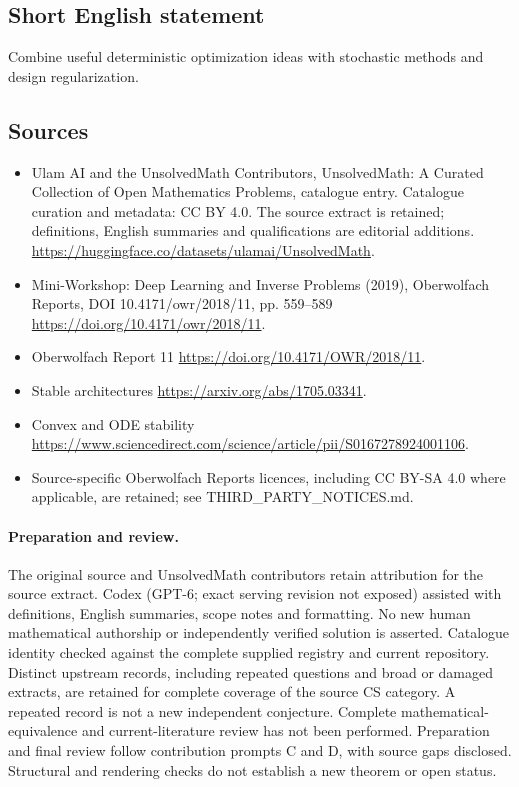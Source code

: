 \documentclass[11pt]{article}
\begin{document}
\subsection{Short English statement}
Combine useful deterministic optimization ideas with stochastic methods and design regularization.
\subsection{Sources}
\begin{itemize}
\item[\hypertarget{source:statement:1}{S1}] Ulam AI and the UnsolvedMath Contributors, UnsolvedMath: A Curated Collection of Open Mathematics Problems, catalogue entry. Catalogue curation and metadata: CC BY 4.0. The source extract is retained; definitions, English summaries and qualifications are editorial additions.
\url{https://huggingface.co/datasets/ulamai/UnsolvedMath}.
\item[\hypertarget{source:statement:2}{S2}] Mini-Workshop: Deep Learning and Inverse Problems (2019), Oberwolfach Reports, DOI 10.4171/owr/2018/11, pp. 559--589
\url{https://doi.org/10.4171/owr/2018/11}.
\item[\hypertarget{source:statement:3}{S3}] Oberwolfach Report 11
\url{https://doi.org/10.4171/OWR/2018/11}.
\item[\hypertarget{source:statement:4}{S4}] Stable architectures
\url{https://arxiv.org/abs/1705.03341}.
\item[\hypertarget{source:statement:5}{S5}] Convex and ODE stability
\url{https://www.sciencedirect.com/science/article/pii/S0167278924001106}.
\item Source-specific Oberwolfach Reports licences, including CC BY-SA 4.0 where applicable, are retained; see THIRD\_PARTY\_NOTICES.md.
\end{itemize}
\paragraph{Preparation and review.}
The original source and UnsolvedMath contributors retain attribution for the source extract. Codex (GPT-6; exact serving revision not exposed) assisted with definitions, English summaries, scope notes and formatting. No new human mathematical authorship or independently verified solution is asserted. Catalogue identity checked against the complete supplied registry and current repository. Distinct upstream records, including repeated questions and broad or damaged extracts, are retained for complete coverage of the source CS category. A repeated record is not a new independent conjecture. Complete mathematical-equivalence and current-literature review has not been performed. Preparation and final review follow contribution prompts C and D, with source gaps disclosed. Structural and rendering checks do not establish a new theorem or open status.
\label{end:statement}
\end{document}
